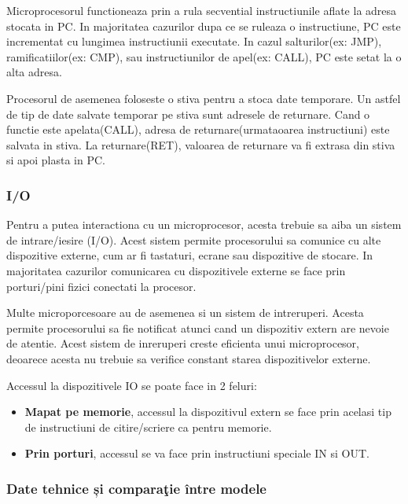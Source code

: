 \documentclass[titlepage,12pt]{article}
\begin{document}
    Microprocesorul functioneaza prin a rula secvential instructiunile aflate la adresa stocata in PC.
    In majoritatea cazurilor dupa ce se ruleaza o instructiune, PC este incrementat cu lungimea instructiunii executate.
    In cazul salturilor(ex: JMP), ramificatiilor(ex: CMP), sau instructiunilor de apel(ex: CALL), PC este setat la o alta adresa.

    Procesorul de asemenea foloseste o stiva pentru a stoca date temporare. Un astfel de tip de date salvate temporar pe stiva sunt adresele de returnare.
    Cand o functie este apelata(CALL), adresa de returnare(urmataoarea instructiuni) este salvata in stiva. La returnare(RET), valoarea de returnare va fi extrasa din stiva si apoi plasta in PC.

    \subsubsection{I/O}

    Pentru a putea interactiona cu un microprocesor, acesta trebuie sa aiba un sistem de intrare/iesire (I/O).
    Acest sistem permite procesorului sa comunice cu alte dispozitive externe, cum ar fi tastaturi, ecrane sau dispozitive de stocare.
    In majoritatea cazurilor comunicarea cu dispozitivele externe se face prin porturi/pini fizici conectati la procesor.

    Multe microporcesoare au de asemenea si un sistem de intreruperi. Acesta permite procesorului sa fie notificat atunci cand un dispozitiv extern are nevoie de atentie.
    Acest sistem de inreruperi creste eficienta unui microprocesor, deoarece acesta nu trebuie sa verifice constant starea dispozitivelor externe.

    Accessul la dispozitivele IO se poate face in 2 feluri:
    \begin{itemize}
        \item \textbf{Mapat pe memorie}, accessul la dispozitivul extern se face prin acelasi tip de instructiuni de citire/scriere ca pentru memorie.
        \item \textbf{Prin porturi}, accessul se va face prin instructiuni speciale IN si OUT.
    \end{itemize}

    \subsubsection{Date tehnice și comparaţie între modele}
\end{document}
